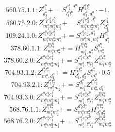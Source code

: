 \documentclass[letterpaper,10pt,fleqn,leqno,onecolumn]{article}
\begin{document}
\begin{equation} \;\;\;\;\;\;  560.75.1.1: Z^{e_{1}^{b}}_{d_{1}^{b}}+=S^{e_{1}^{b},d_{1}^{a}}_{l_{1}^{a}l_{1}^{b}}H^{l_{1}^{a}l_{1}^{b}}_{d_{1}^{b},d_{1}^{a}}\cdot -1. \end{equation}
\begin{equation} \;\;\;\;\;\;  560.75.2.0: Z^{e_{1}^{a}e_{2}^{a}e_{1}^{b}}_{m_{1}^{a}m_{2}^{a}m_{1}^{b}}+=S^{e_{1}^{a}e_{2}^{a},d_{1}^{b}}_{m_{1}^{a}m_{2}^{a}m_{1}^{b}}Z^{e_{1}^{b}}_{d_{1}^{b}} \end{equation}
\begin{equation} \;\;\;\;\;\;  109.24.1.0: Z^{e_{1}^{a}e_{2}^{a}e_{1}^{b}}_{m_{1}^{a}m_{2}^{a}m_{1}^{b}}+=S^{e_{1}^{a}e_{2}^{a},d_{1}^{b}}_{m_{1}^{a}m_{2}^{a}m_{1}^{b}}H^{e_{1}^{b}}_{d_{1}^{b}} \end{equation}
\begin{equation} \;\;\;\;\;\;  378.60.1.1: Z^{l_{1}^{a}l_{2}^{a}}_{m_{1}^{a}m_{2}^{a}}+=H^{l_{1}^{a}l_{2}^{a}}_{m_{1}^{a},d_{1}^{a}}S^{d_{1}^{a}}_{m_{2}^{a}} \end{equation}
\begin{equation} \;\;\;\;\;\;  378.60.2.0: Z^{e_{1}^{a}e_{2}^{a}e_{1}^{b}}_{m_{1}^{a}m_{2}^{a}m_{1}^{b}}+=S^{e_{1}^{a}e_{2}^{a}e_{1}^{b}}_{m_{1}^{b},l_{1}^{a}l_{2}^{a}}Z^{l_{1}^{a}l_{2}^{a}}_{m_{1}^{a}m_{2}^{a}} \end{equation}
\begin{equation} \;\;\;\;\;\;  704.93.1.2: Z^{l_{1}^{a}l_{2}^{a}}_{m_{1}^{a},d_{1}^{a}}+=H^{l_{1}^{a}l_{2}^{a}}_{d_{1}^{a},d_{2}^{a}}S^{d_{2}^{a}}_{m_{1}^{a}}\cdot 0.5 \end{equation}
\begin{equation} \;\;\;\;\;\;  704.93.2.1: Z^{l_{1}^{a}l_{2}^{a}}_{m_{1}^{a}m_{2}^{a}}+=S^{d_{1}^{a}}_{m_{1}^{a}}Z^{l_{1}^{a}l_{2}^{a}}_{m_{2}^{a},d_{1}^{a}} \end{equation}
\begin{equation} \;\;\;\;\;\;  704.93.3.0: Z^{e_{1}^{a}e_{2}^{a}e_{1}^{b}}_{m_{1}^{a}m_{2}^{a}m_{1}^{b}}+=S^{e_{1}^{a}e_{2}^{a}e_{1}^{b}}_{m_{1}^{b},l_{1}^{a}l_{2}^{a}}Z^{l_{1}^{a}l_{2}^{a}}_{m_{1}^{a}m_{2}^{a}} \end{equation}
\begin{equation} \;\;\;\;\;\;  568.76.1.1: Z^{l_{1}^{a}l_{2}^{a}}_{m_{1}^{a}m_{2}^{a}}+=S^{d_{1}^{a}d_{2}^{a}}_{m_{1}^{a}m_{2}^{a}}H^{l_{1}^{a}l_{2}^{a}}_{d_{1}^{a}d_{2}^{a}} \end{equation}
\begin{equation} \;\;\;\;\;\;  568.76.2.0: Z^{e_{1}^{a}e_{2}^{a}e_{1}^{b}}_{m_{1}^{a}m_{2}^{a}m_{1}^{b}}+=S^{e_{1}^{a}e_{2}^{a}e_{1}^{b}}_{m_{1}^{b},l_{1}^{a}l_{2}^{a}}Z^{l_{1}^{a}l_{2}^{a}}_{m_{1}^{a}m_{2}^{a}} \end{equation}
\end{document}
